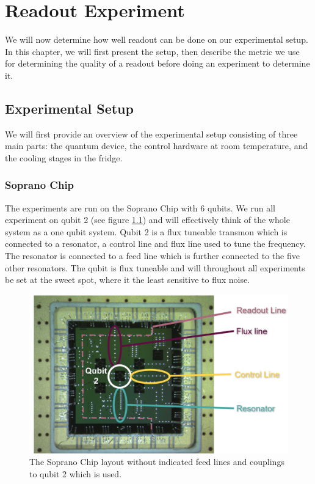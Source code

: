 \chapter{Readout Experiment}\label{chap:readout}
We will now determine how well readout can be done on our experimental setup. In this chapter, we will first present the setup, then describe the metric we use for determining the quality of a readout before doing an experiment to determine it.

\section{Experimental Setup}
We will first provide an overview of the experimental setup consisting of three main parts: the quantum device, the control hardware at room temperature, and the cooling stages in the fridge.


\subsection{Soprano Chip}
The experiments are run on the Soprano Chip with 6 qubits. We run all experiment on qubit 2 (see figure \ref{fig:soprano}) and will effectively think of the whole system as a one qubit system. Qubit 2 is a flux tuneable transmon which is connected to a resonator, a control line and flux line used to tune the frequency. The resonator is connected to a feed line which is further connected to the five other resonators. The qubit is flux tuneable and will throughout all experiments be set at the sweet spot,  where it the least sensitive to flux noise. 

\begin{figure}[h]
    \centering
    \includegraphics[width = \textwidth]{Figs/hardware/qubit.png}
    \caption{The Soprano Chip layout without indicated feed lines and couplings to qubit 2 which is used.}
    \label{fig:soprano}
\end{figure}

